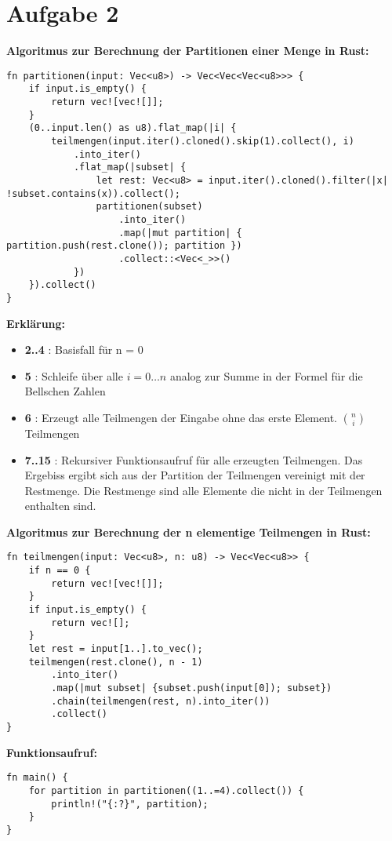 \documentclass[a4paper]{scrartcl}
\begin{document}
\section*{Aufgabe 2}
\textbf{Algoritmus zur Berechnung der Partitionen einer Menge in Rust:}
\begin{lstlisting}
fn partitionen(input: Vec<u8>) -> Vec<Vec<Vec<u8>>> {
    if input.is_empty() {
        return vec![vec![]];
    }
    (0..input.len() as u8).flat_map(|i| {
        teilmengen(input.iter().cloned().skip(1).collect(), i)
            .into_iter()
            .flat_map(|subset| {
                let rest: Vec<u8> = input.iter().cloned().filter(|x| !subset.contains(x)).collect();
                partitionen(subset)
                    .into_iter()
                    .map(|mut partition| { partition.push(rest.clone()); partition })
                    .collect::<Vec<_>>()
            })
    }).collect()
} 
\end{lstlisting}
\newpage
\textbf{Erklärung:}
\begin{itemize}
    \item \textbf{2..4} : Basisfall für n = 0
    \item \textbf{5} : Schleife über alle $ i = 0 \ldots n $ analog zur Summe in der Formel für die Bellschen Zahlen
    \item \textbf{6} : Erzeugt alle Teilmengen der Eingabe ohne das erste Element. $\binom{n}{i}$ Teilmengen
    \item \textbf{7..15} : Rekursiver Funktionsaufruf für alle erzeugten Teilmengen. Das Ergebiss ergibt sich aus der Partition der Teilmengen vereinigt mit der Restmenge. 
    Die Restmenge sind alle Elemente die nicht in der Teilmengen enthalten sind.
\end{itemize}

\textbf{Algoritmus zur Berechnung der n elementige Teilmengen in Rust:}
\begin{lstlisting}
fn teilmengen(input: Vec<u8>, n: u8) -> Vec<Vec<u8>> {
    if n == 0 {
        return vec![vec![]];
    }  
    if input.is_empty() {
        return vec![];
    }
    let rest = input[1..].to_vec();
    teilmengen(rest.clone(), n - 1)
        .into_iter()
        .map(|mut subset| {subset.push(input[0]); subset})
        .chain(teilmengen(rest, n).into_iter())
        .collect()
}
\end{lstlisting}

\textbf{Funktionsaufruf:}
\begin{lstlisting}
fn main() {
    for partition in partitionen((1..=4).collect()) {
        println!("{:?}", partition);
    }
}
\end{lstlisting}
\end{document}
